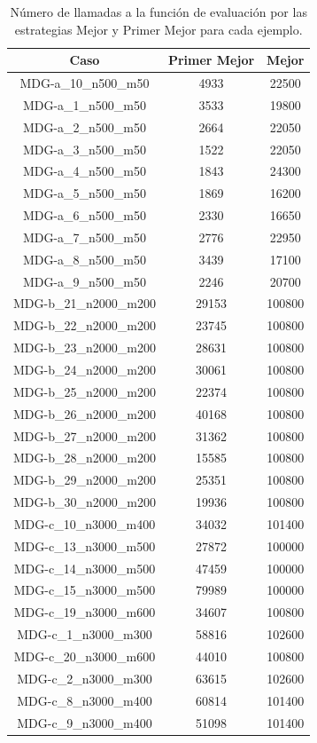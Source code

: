 \documentclass{article}
\begin{document}
\begin{table}[H]
	\centering
	\begin{tabular}{|ccc|}
		\hline
		Caso & Primer Mejor & Mejor\\ \hline
		MDG-a\_10\_n500\_m50 & 4933 & 22500\\
		MDG-a\_1\_n500\_m50 & 3533 & 19800\\
		MDG-a\_2\_n500\_m50 & 2664 & 22050\\
		MDG-a\_3\_n500\_m50 & 1522 & 22050\\
		MDG-a\_4\_n500\_m50 & 1843 & 24300\\
		MDG-a\_5\_n500\_m50 & 1869 & 16200\\
		MDG-a\_6\_n500\_m50 & 2330 & 16650\\
		MDG-a\_7\_n500\_m50 & 2776 & 22950\\
		MDG-a\_8\_n500\_m50 & 3439 & 17100\\
		MDG-a\_9\_n500\_m50 & 2246 & 20700\\
		MDG-b\_21\_n2000\_m200 & 29153 & 100800\\
		MDG-b\_22\_n2000\_m200 & 23745 & 100800\\
		MDG-b\_23\_n2000\_m200 & 28631 & 100800\\
		MDG-b\_24\_n2000\_m200 & 30061 & 100800\\
		MDG-b\_25\_n2000\_m200 & 22374 & 100800\\
		MDG-b\_26\_n2000\_m200 & 40168 & 100800\\
		MDG-b\_27\_n2000\_m200 & 31362 & 100800\\
		MDG-b\_28\_n2000\_m200 & 15585 & 100800\\
		MDG-b\_29\_n2000\_m200 & 25351 & 100800\\
		MDG-b\_30\_n2000\_m200 & 19936 & 100800\\
		MDG-c\_10\_n3000\_m400 & 34032 & 101400\\
		MDG-c\_13\_n3000\_m500 & 27872 & 100000\\
		MDG-c\_14\_n3000\_m500 & 47459 & 100000\\
		MDG-c\_15\_n3000\_m500 & 79989 & 100000\\
		MDG-c\_19\_n3000\_m600 & 34607 & 100800\\
		MDG-c\_1\_n3000\_m300 & 58816 & 102600\\
		MDG-c\_20\_n3000\_m600 & 44010 & 100800\\
		MDG-c\_2\_n3000\_m300 & 63615 & 102600\\
		MDG-c\_8\_n3000\_m400 & 60814 & 101400\\
		MDG-c\_9\_n3000\_m400 & 51098 & 101400\\
		\hline
	\end{tabular}
	\caption{Número de llamadas a la función de evaluación por las estrategias Mejor y Primer Mejor para cada ejemplo.}
	\label{tab:calls}
\end{table}
\end{document}
